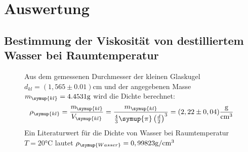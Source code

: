 \section{Auswertung}
\label{sec:Auswertung}


\subsection{Bestimmung der Viskosität von destilliertem Wasser bei Raumtemperatur}
\begin{figure}
  Aus dem gemessenen Durchmesser der kleinen Glaskugel $d_{kl}=(1,565\pm0.01) \unit{\centi\metre}$ und der angegebenen Masse
  $m_{\symup{kl}}=4.4531\unit{\gram}$ wird die Dichte berechnet:
  \begin{equation}
    \rho_{\symup{kl}}=\frac{\emph{m}_{\symup{kl}}}{V_{\symup{kl}}}=%
    \frac{m_{\symup{kl}}}{\frac{4}{3}\symup{\pi}\left(\frac{d}{2}\right)^3}=(2,22\pm0,04) \unit{\gram\per\cubic\centi\metre}
  \end{equation}
  Ein Literaturwert für die Dichte von Wasser bei Raumtemperatur $T=20 \unit{\celsius}$ lautet
  $\rho_{\symup{Wasser}}=0,99823 \unit{\gram\per\cubic\centi\metre}$\cite[551/C23]{czichos}
  
\end{figure}


